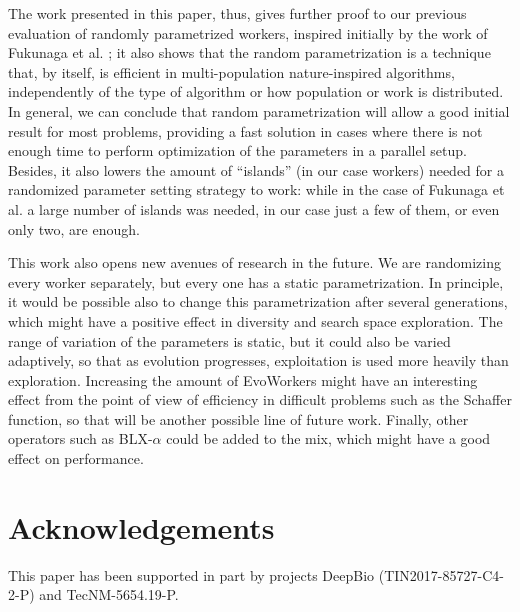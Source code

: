 \documentclass[conference]{IEEEtran}
\begin{document}
The work presented in this paper, thus, gives further proof to our
previous evaluation of randomly parametrized workers, inspired
initially by the work of Fukunaga et al. \cite{fuku1}; it also shows that the random
parametrization is a technique that, by itself, is efficient in
multi-population nature-inspired algorithms, independently of the type
of algorithm or how population or work is distributed. In general, we
can conclude that 
random parametrization will allow a good initial result for most
problems, providing a fast solution in cases where there is not enough
time to perform optimization of the parameters in a parallel
setup. Besides, it also lowers the amount of ``islands'' (in our case
workers) needed for a randomized parameter setting strategy to work:
while in the case of Fukunaga et al. \cite{fuku1} a large number of islands was
needed, in our case just a few of them, or even only two, are
enough.

This work also opens new avenues of research in the future. We are
randomizing every worker separately, but every one has a static
parametrization. In principle, it would be possible also to change
this parametrization after several generations, which might have a
positive effect in diversity and search space exploration. The range
of variation of the parameters is static, but it could also be varied
adaptively, so that as evolution progresses, exploitation is used more
heavily than exploration. Increasing the amount of EvoWorkers might
have an interesting effect from the point of view of efficiency in
difficult problems such as the Schaffer function, so that will be
another possible line of future work.
Finally, other operators such as
BLX-$\alpha$ could be added to the mix, which might have a good effect
on performance.


\section*{Acknowledgements}

This paper has been supported in part by projects DeepBio (TIN2017-85727-C4-2-P)
and TecNM-5654.19-P.






\end{document}
